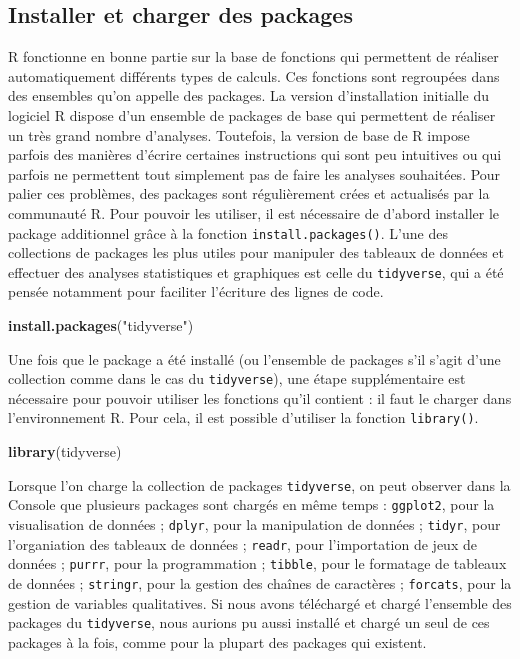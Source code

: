 \documentclass[
  french,
]{book}
\newenvironment{Shaded}{\begin{snugshade}}{\end{snugshade}}
\newcommand{\KeywordTok}[1]{\textcolor[rgb]{0.13,0.29,0.53}{\textbf{#1}}}
\newcommand{\NormalTok}[1]{#1}
\newcommand{\StringTok}[1]{\textcolor[rgb]{0.31,0.60,0.02}{#1}}
\begin{document}
\hypertarget{installer-et-charger-des-packages}{%
\subsection{Installer et charger des packages}\label{installer-et-charger-des-packages}}

R fonctionne en bonne partie sur la base de fonctions qui permettent de réaliser automatiquement différents types de calculs. Ces fonctions sont regroupées dans des ensembles qu'on appelle des packages. La version d'installation initialle du logiciel R dispose d'un ensemble de packages de base qui permettent de réaliser un très grand nombre d'analyses. Toutefois, la version de base de R impose parfois des manières d'écrire certaines instructions qui sont peu intuitives ou qui parfois ne permettent tout simplement pas de faire les analyses souhaitées. Pour palier ces problèmes, des packages sont régulièrement crées et actualisés par la communauté R. Pour pouvoir les utiliser, il est nécessaire de d'abord installer le package additionnel grâce à la fonction \texttt{install.packages()}. L'une des collections de packages les plus utiles pour manipuler des tableaux de données et effectuer des analyses statistiques et graphiques est celle du \texttt{tidyverse}, qui a été pensée notamment pour faciliter l'écriture des lignes de code.

\begin{Shaded}
\begin{Highlighting}[]
\KeywordTok{install.packages}\NormalTok{(}\StringTok{"tidyverse"}\NormalTok{)}
\end{Highlighting}
\end{Shaded}

Une fois que le package a été installé (ou l'ensemble de packages s'il s'agit d'une collection comme dans le cas du \texttt{tidyverse}), une étape supplémentaire est nécessaire pour pouvoir utiliser les fonctions qu'il contient : il faut le charger dans l'environnement R. Pour cela, il est possible d'utiliser la fonction \texttt{library()}.

\begin{Shaded}
\begin{Highlighting}[]
\KeywordTok{library}\NormalTok{(tidyverse)}
\end{Highlighting}
\end{Shaded}

Lorsque l'on charge la collection de packages \texttt{tidyverse}, on peut observer dans la Console que plusieurs packages sont chargés en même temps : \texttt{ggplot2}, pour la visualisation de données ; \texttt{dplyr}, pour la manipulation de données ; \texttt{tidyr}, pour l'organiation des tableaux de données ; \texttt{readr}, pour l'importation de jeux de données ; \texttt{purrr}, pour la programmation ; \texttt{tibble}, pour le formatage de tableaux de données ; \texttt{stringr}, pour la gestion des chaînes de caractères ; \texttt{forcats}, pour la gestion de variables qualitatives. Si nous avons téléchargé et chargé l'ensemble des packages du \texttt{tidyverse}, nous aurions pu aussi installé et chargé un seul de ces packages à la fois, comme pour la plupart des packages qui existent.
\end{document}
